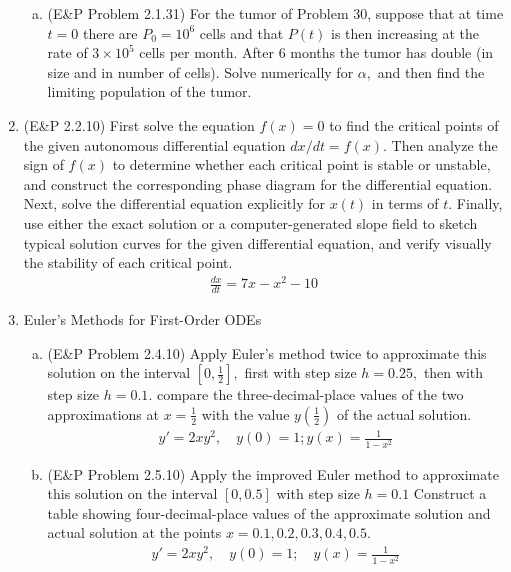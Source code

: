 \documentclass{article}
\begin{document}
\begin{enumerate}
\begin{enumerate}[(a)]
			\item (E\&P Problem 2.1.31) For the tumor of Problem 30, suppose that at time $t=0$ there are $P_0=10^6$ cells and that $P(t)$ is then increasing at the rate of $3\times 10^5$ cells per month. After 6 months the tumor has double (in size and in number of cells). Solve numerically for $\alpha,$ and then find the limiting population of the tumor.
				
		\end{enumerate}

	\item (E\&P 2.2.10) First solve the equation $f(x)=0$ to find the critical points of the given autonomous differential equation $dx/dt=f(x).$ Then analyze the sign of $f(x)$ to determine whether each critical point is stable or unstable, and construct the corresponding phase diagram for the differential equation. Next, solve the differential equation explicitly for $x(t)$ in terms of $t.$ Finally, use either the exact solution or a computer-generated slope field to sketch typical solution curves for the given differential equation, and verify visually the stability of each critical point.
		\begin{align*}
			\frac{dx}{dt} = 7x-x^2-10
		\end{align*}

	\item Euler's Methods for First-Order ODEs
		\begin{enumerate}[(a)]
			\item (E\&P Problem 2.4.10) Apply Euler's method twice to approximate this solution on the interval $\left[ 0, \frac{1}{2} \right],$ first with step size $h=0.25,$ then with step size $h=0.1.$ compare the three-decimal-place values of the two approximations at $x=\frac{1}{2}$ with the value $y\left( \frac{1}{2} \right)$ of the actual solution.
				\begin{align*}
					y'=2xy^2, \quad y(0)=1; y(x)=\frac{1}{1-x^2}
				\end{align*}

			\item (E\&P Problem 2.5.10) Apply the improved Euler method to approximate this solution on the interval $[0, 0.5]$ with step size $h=0.1$ Construct a table showing four-decimal-place values of the approximate solution and actual solution at the points $x=0.1, 0.2, 0.3, 0.4, 0.5.$
				\begin{align*}
					y'=2xy^2, \quad y(0)=1; \quad y(x)=\frac{1}{1-x^2}
				\end{align*}

		\end{enumerate}
		
\end{enumerate}
\end{document}

